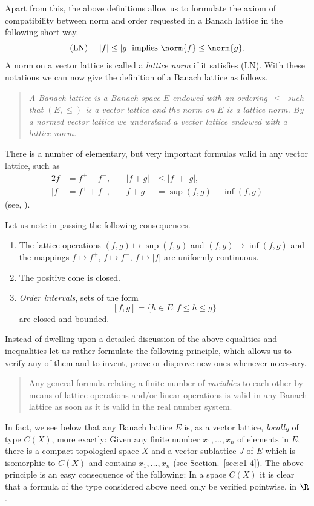 Apart from this, the above definitions allow us to formulate the axiom of compatibility between norm and order requested in a Banach lattice in the following short way.
\begin{equation}\label{eq:c1-1}
	\text{(LN)} \quad \text{ $|f| \leq |g|$ implies $ \norm{f} \leq \norm{g} $.}   
\end{equation}
A norm on a vector lattice is called a \emph{lattice norm} if it satisfies (LN).
With these notations we can now give the definition of a Banach lattice as follows.
\begin{quote}
\textit{A \emph{Banach lattice} is a Banach space $ E $ endowed with an ordering $ \,\leq\, $ such that $ (E,\leq) $ is a vector lattice and the norm on $ E $ is a lattice norm.
By a \emph{normed vector lattice} we understand a vector lattice endowed with a lattice norm.}
\end{quote}
There is a number of elementary, but very important formulas valid in any vector lattice, such as
\begin{alignat*}{2}
f &= f^{+} - f^{-} ,   &\quad |f + g| & \leq |f| + |g|, \\
|f| &= f^{+} + f^{-} , &\quad  f + g  & = \sup(f,g) + \inf(f,g)
\end{alignat*}
(see, \eg \textcite[Chap. II, §1]{schaefer:1974}).

Let us note in passing the following consequences.
%
\begin{enumerate}[\upshape (i)]
\item 
The lattice operations $ (f,g) \mapsto \sup(f,g) $ and $ (f,g) \mapsto \inf(f,g) $ and the mappings $ f \mapsto f^{+} $, $ f \mapsto f^{-} $, $ f \mapsto |f| $ are uniformly continuous.

\item 
The positive cone is closed.

\item 
\emph{Order intervals}, \ie sets of the form
\[
	\left[ f,g \right] = \{ h \in E \colon f \leq h \leq g \}
\]
are closed and bounded.
\end{enumerate}
Instead of dwelling upon a detailed discussion of the above equalities and inequalities let us rather formulate the following principle, which allows us to verify any of them and to invent, prove or disprove new ones whenever necessary.
\begin{quote}
Any general formula relating a finite number of \emph{variables} to each other by means of lattice operations and/or linear operations is valid in any Banach lattice as soon as it is valid in the real number system. 
\end{quote}
In fact, we see below that any Banach lattice $ E $ is, as a vector lattice, \emph{locally} of type $ C(X) $, more exactly:
Given any finite number $ x_{1},\ldots,x_{n} $ of elements in $ E $, there is a compact topological space $ X $ and a vector sublattice $ J $ of\/ $ E $ which is isomorphic to $ C(X) $ and contains $ x_{1},\ldots,x_{n} $ (see Section.~\ref{sec:c1-4}).
The above principle is an easy consequence of the following:
In a space $ C(X) $ it is clear that a formula of the type considered above need only be verified pointwise, \ie  in $ \R $.

